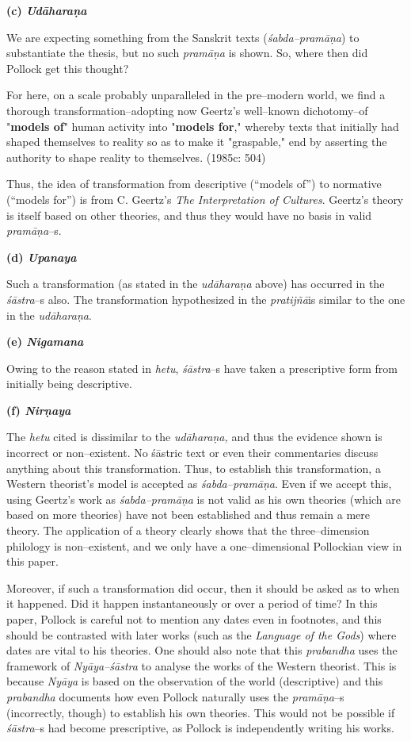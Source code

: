 \textbf{(c) \textit{Udāharaṇa}}

We are expecting something from the Sanskrit texts (\textit{śabda–pramāṇa}) to substantiate the thesis, but no such \textit{pramāṇa} is shown. So, where then did Pollock get this thought?

\begin{myquote}
For here, on a scale probably unparalleled in the pre–modern world, we find a thorough transformation–adopting now Geertz's well–known dichotomy–of "\textbf{models of}" human activity into "\textbf{models for}," whereby texts that initially had shaped themselves to reality so as to make it "graspable," end by asserting the authority to shape reality to themselves. (1985c: 504)
\end{myquote}

Thus, the idea of transformation from descriptive (“models of”) to normative (“models for”) is from C. Geertz’s \textit{The Interpretation of Cultures}. Geertz’s theory is itself based on other theories, and thus they would have no basis in valid\textit{ pramāṇa}–s.

\textbf{(d) \textit{Upanaya}}

Such a transformation (as stated in the \textit{udāharaṇa} above) has occurred in the \textit{śāstra}–s also. The transformation hypothesized in the \textit{pratijñā}is similar to the one in the\textit{ udāharaṇa}.

\textbf{(e) \textit{Nigamana}}

Owing to the reason stated in \textit{hetu}, \textit{śāstra}–s have taken a prescriptive form from initially being descriptive.

\textbf{(f) \textit{Nirṇaya}}

The \textit{hetu} cited is dissimilar to the\textit{ udāharaṇa, }and thus the evidence shown is incorrect or non–existent. No śāstric text or even their commentaries discuss anything about this transformation. Thus, to establish this transformation, a Western theorist’s model is accepted as \textit{śabda–pramāṇa}. Even if we accept this, using Geertz’s work as \textit{śabda–pramāṇa} is not valid as his own theories (which are based on more theories) have not been established and thus remain a mere theory. The application of a theory clearly shows that the three–dimension philology is non–existent, and we only have a one–dimensional Pollockian view in this paper.

Moreover, if such a transformation did occur, then it should be asked as to when it happened. Did it happen instantaneously or over a period of time? In this paper, Pollock is careful not to mention any dates even in footnotes, and this should be contrasted with later works (such as the \textit{Language of the Gods}) where dates are vital to his theories. One should also note that this \textit{prabandha} uses the framework of \textit{Nyāya–śāstra }to analyse the works of the Western theorist. This is because \textit{Nyāya }is based on the observation of the world (descriptive) and this \textit{prabandha} documents how even Pollock naturally uses the \textit{pramāṇa}–s (incorrectly, though) to establish his own theories. This would not be possible if \textit{śāstra}–s had become prescriptive, as Pollock is independently writing his works.

